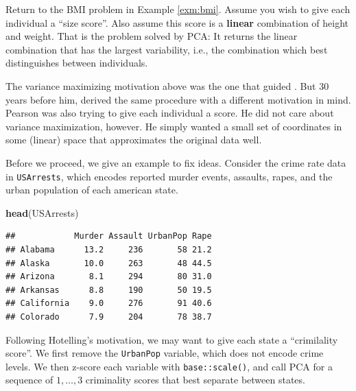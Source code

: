 \documentclass[]{book}
\newenvironment{Shaded}{\begin{snugshade}}{\end{snugshade}}
\newcommand{\DataTypeTok}[1]{\textcolor[rgb]{0.13,0.29,0.53}{#1}}
\newcommand{\DecValTok}[1]{\textcolor[rgb]{0.00,0.00,0.81}{#1}}
\newcommand{\FloatTok}[1]{\textcolor[rgb]{0.00,0.00,0.81}{#1}}
\newcommand{\KeywordTok}[1]{\textcolor[rgb]{0.13,0.29,0.53}{\textbf{#1}}}
\newcommand{\NormalTok}[1]{#1}
\newcommand{\OperatorTok}[1]{\textcolor[rgb]{0.81,0.36,0.00}{\textbf{#1}}}
\newcommand{\OtherTok}[1]{\textcolor[rgb]{0.56,0.35,0.01}{#1}}
\newcommand{\StringTok}[1]{\textcolor[rgb]{0.31,0.60,0.02}{#1}}
\theoremstyle{definition}
\theoremstyle{definition}
\theoremstyle{definition}
\theoremstyle{remark}
\begin{document}
Return to the BMI problem in Example \ref{exm:bmi}.
Assume you wish to give each individual a ``size score''.
Also assume this score is a \textbf{linear} combination of height and weight.
That is the problem solved by PCA:
It returns the linear combination that has the largest variability, i.e., the combination which best distinguishes between individuals.

The variance maximizing motivation above was the one that guided \citet{hotelling1933analysis}.
But \(30\) years before him, \citet{pearson1901liii} derived the same procedure with a different motivation in mind.
Pearson was also trying to give each individual a score.
He did not care about variance maximization, however.
He simply wanted a small set of coordinates in some (linear) space that approximates the original data well.

Before we proceed, we give an example to fix ideas.
Consider the crime rate data in \texttt{USArrests}, which encodes reported murder events, assaults, rapes, and the urban population of each american state.

\begin{Shaded}
\begin{Highlighting}[]
\KeywordTok{head}\NormalTok{(USArrests)}
\end{Highlighting}
\end{Shaded}

\begin{verbatim}
##            Murder Assault UrbanPop Rape
## Alabama      13.2     236       58 21.2
## Alaska       10.0     263       48 44.5
## Arizona       8.1     294       80 31.0
## Arkansas      8.8     190       50 19.5
## California    9.0     276       91 40.6
## Colorado      7.9     204       78 38.7
\end{verbatim}

Following Hotelling's motivation, we may want to give each state a ``crimilality score''.
We first remove the \texttt{UrbanPop} variable, which does not encode crime levels.
We then z-score each variable with \texttt{base::scale()}, and call PCA for a sequence of \(1,\dots,3\) criminality scores that best separate between states.

\begin{Shaded}
\end{Shaded}
\end{document}
